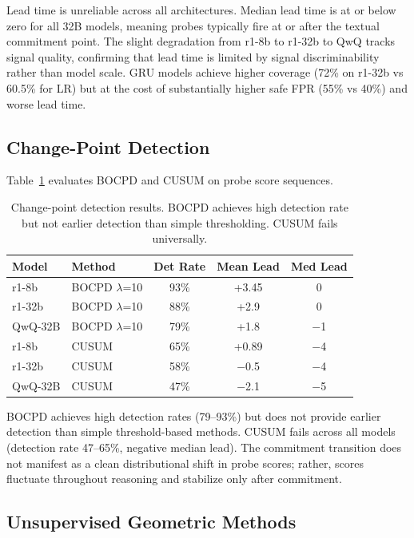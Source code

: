 \documentclass[11pt,a4paper]{article}
\begin{document}
Lead time is unreliable across all architectures. Median lead time is at or below zero for all 32B models, meaning probes typically fire at or after the textual commitment point. The slight degradation from r1-8b to r1-32b to QwQ tracks signal quality, confirming that lead time is limited by signal discriminability rather than model scale. GRU models achieve higher coverage (72\% on r1-32b vs 60.5\% for LR) but at the cost of substantially higher safe FPR (55\% vs 40\%) and worse lead time.

\subsection{Change-Point Detection}

Table~\ref{tab:cpd} evaluates BOCPD and CUSUM on probe score sequences.

\begin{table}[t]
\centering
\small
\caption{Change-point detection results. BOCPD achieves high detection rate but not earlier detection than simple thresholding. CUSUM fails universally.}
\label{tab:cpd}
\begin{tabular}{llccc}
\toprule
Model & Method & Det Rate & Mean Lead & Med Lead \\
\midrule
r1-8b & BOCPD $\lambda$=10 & 93\% & +3.45 & 0 \\
r1-32b & BOCPD $\lambda$=10 & 88\% & +2.9 & 0 \\
QwQ-32B & BOCPD $\lambda$=10 & 79\% & +1.8 & $-$1 \\
\midrule
r1-8b & CUSUM & 65\% & +0.89 & $-$4 \\
r1-32b & CUSUM & 58\% & $-$0.5 & $-$4 \\
QwQ-32B & CUSUM & 47\% & $-$2.1 & $-$5 \\
\bottomrule
\end{tabular}
\end{table}

BOCPD achieves high detection rates (79--93\%) but does not provide earlier detection than simple threshold-based methods. CUSUM fails across all models (detection rate 47--65\%, negative median lead). The commitment transition does not manifest as a clean distributional shift in probe scores; rather, scores fluctuate throughout reasoning and stabilize only after commitment.

\subsection{Unsupervised Geometric Methods}
\end{document}
